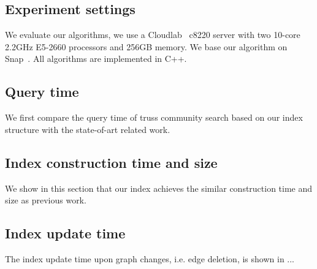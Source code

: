 \subsection{Experiment settings}
\label{eval_system}

We evaluate our algorithms, we use a Cloudlab~\cite{RicciEide:login14} c8220 server with two 10-core 2.2GHz E5-2660 processors and 256GB memory. We base our algorithm on Snap~\cite{snapnets}. All algorithms are implemented in C++. 

\subsection{Query time}
\label{eval_query_time}

We first compare the query time of truss community search based on our index structure with the state-of-art related work.
 
\subsection{Index construction time and size}
\label{eval_const}

We show in this section that our index achieves the similar construction time and size as previous work.

\subsection{Index update time}
\label{eval_update}

The index update time upon graph changes, i.e. edge deletion, is shown in ... 


